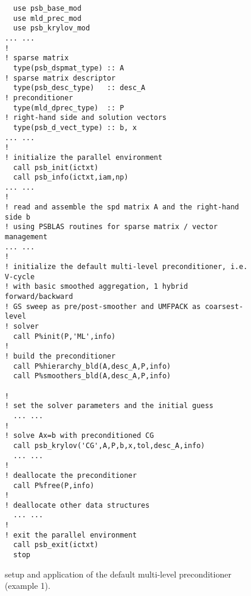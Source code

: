\begin{figure}[tbp]
\begin{center}
\begin{minipage}{.90\textwidth} 
{\small
\begin{verbatim}
  use psb_base_mod
  use mld_prec_mod
  use psb_krylov_mod
... ...
!
! sparse matrix
  type(psb_dspmat_type) :: A
! sparse matrix descriptor
  type(psb_desc_type)   :: desc_A
! preconditioner
  type(mld_dprec_type)  :: P
! right-hand side and solution vectors
  type(psb_d_vect_type) :: b, x
... ...
!
! initialize the parallel environment
  call psb_init(ictxt)
  call psb_info(ictxt,iam,np)
... ...
!
! read and assemble the spd matrix A and the right-hand side b 
! using PSBLAS routines for sparse matrix / vector management
... ...
!
! initialize the default multi-level preconditioner, i.e. V-cycle
! with basic smoothed aggregation, 1 hybrid forward/backward
! GS sweep as pre/post-smoother and UMFPACK as coarsest-level
! solver
  call P%init(P,'ML',info)
!
! build the preconditioner
  call P%hierarchy_bld(A,desc_A,P,info)
  call P%smoothers_bld(A,desc_A,P,info)

!
! set the solver parameters and the initial guess
  ... ...
!
! solve Ax=b with preconditioned CG
  call psb_krylov('CG',A,P,b,x,tol,desc_A,info)
  ... ...
!
! deallocate the preconditioner
  call P%free(P,info)
!
! deallocate other data structures
  ... ...
!
! exit the parallel environment
  call psb_exit(ictxt)
  stop
\end{verbatim}
}
\end{minipage}
\caption{setup and application of the default multi-level preconditioner (example 1).
\label{fig:ex1}}
\end{center}
\end{figure}

